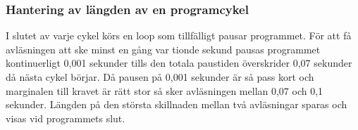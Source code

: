 %  



\subsubsection{Hantering av längden av en programcykel}
\label{sec:system:korning:cykel}

I slutet av varje cykel körs en loop som tillfälligt pausar programmet.
För att få avläsningen att ske minst en gång var tionde sekund pausas
programmet kontinuerligt 0,001 sekunder tills den totala paustiden överskrider 
0,07 sekunder då nästa cykel börjar. Då pausen på 0,001 sekunder är så pass
kort och marginalen till kravet är rätt stor så sker avläsningen mellan
0,07 och 0,1 sekunder. Längden på den största skillnaden mellan två avläsningar
sparas och visas vid programmets slut.

